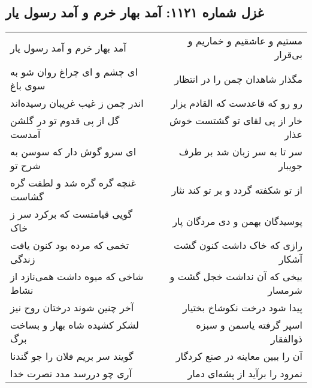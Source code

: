\begin{center}
\section*{غزل شماره ۱۱۲۱: آمد بهار خرم و آمد رسول یار}
\label{sec:1121}
\begin{longtable}{l p{0.5cm} r}
آمد بهار خرم و آمد رسول یار
&&
مستیم و عاشقیم و خماریم و بی‌قرار
\\
ای چشم و ای چراغ روان شو به سوی باغ
&&
مگذار شاهدان چمن را در انتظار
\\
اندر چمن ز غیب غریبان رسیده‌اند
&&
رو رو که قاعدست که القادم یزار
\\
گل از پی قدوم تو در گلشن آمدست
&&
خار از پی لقای تو گشتست خوش عذار
\\
ای سرو گوش دار که سوسن به شرح تو
&&
سر تا به سر زبان شد بر طرف جویبار
\\
غنچه گره گره شد و لطفت گره گشاست
&&
از تو شکفته گردد و بر تو کند نثار
\\
گویی قیامتست که برکرد سر ز خاک
&&
پوسیدگان بهمن و دی مردگان پار
\\
تخمی که مرده بود کنون یافت زندگی
&&
رازی که خاک داشت کنون گشت آشکار
\\
شاخی که میوه داشت همی‌نازد از نشاط
&&
بیخی که آن نداشت خجل گشت و شرمسار
\\
آخر چنین شوند درختان روح نیز
&&
پیدا شود درخت نکوشاخ بختیار
\\
لشکر کشیده شاه بهار و بساخت برگ
&&
اسپر گرفته یاسمن و سبزه ذوالفقار
\\
گویند سر بریم فلان را جو گندنا
&&
آن را ببین معاینه در صنع کردگار
\\
آری چو دررسد مدد نصرت خدا
&&
نمرود را برآید از پشه‌ای دمار
\\
\end{longtable}
\end{center}
